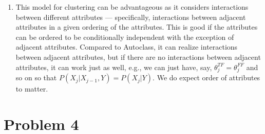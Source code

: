 \documentclass{article}
\begin{document}
\begin{enumerate}
\item This model for clustering can be advantageous as it considers
  interactions between different attributes --- specifically,
  interactions between adjacent attributes in a given ordering of the
  attributes. This is good if the attributes can be ordered to be
  conditionally independent with the exception of adjacent
  attributes. Compared to Autoclass, it can realize interactions
  between adjacent attributes, but if there are no interactions
  between adjacent attributes, it can work just as well, e.g., we can
  just have, say, $\theta_j^{TF}=\theta_j^{FF}$ and so on so that
  $P(X_j|X_{j-1},Y)=P(X_j|Y)$.  We do expect order of attributes to
  matter.
\end{enumerate}
\section*{Problem 4}
\end{document}
